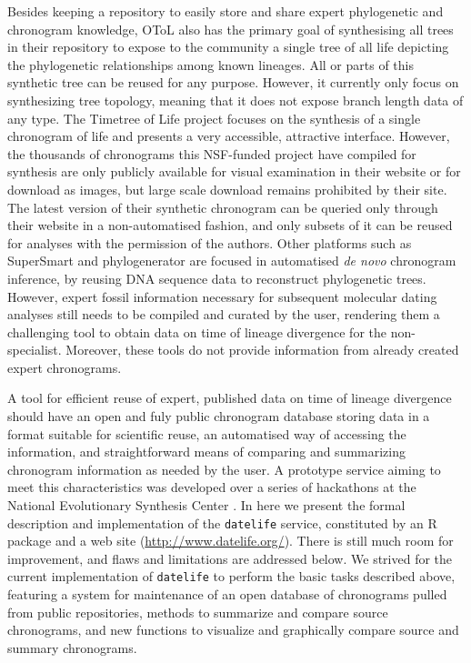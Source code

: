 \documentclass[11pt,]{article}
\begin{document}
Besides keeping a repository to easily store and share expert
phylogenetic and chronogram knowledge, OToL also has the primary goal of
synthesising all trees in their repository to expose to the community a
single tree of all life depicting the phylogenetic relationships among
known lineages. All or parts of this synthetic tree can be reused for
any purpose. However, it currently only focus on synthesizing tree
topology, meaning that it does not expose branch length data of any
type. The Timetree of Life project focuses on the synthesis of a single
chronogram of life \citep{Hedges2006} and presents a very accessible,
attractive interface. However, the thousands of chronograms this
NSF-funded project have compiled for synthesis are only publicly
available for visual examination in their website or for download as
images, but large scale download remains prohibited by their site. The
latest version of their synthetic chronogram \citep{Kumar2017} can be
queried only through their website in a non-automatised fashion, and
only subsets of it can be reused for analyses with the permission of the
authors. Other platforms such as SuperSmart
\citep{antonelli2017supersmart} and phylogenerator
\citep{pearse2013phylogenerator} are focused in automatised \emph{de
novo} chronogram inference, by reusing DNA sequence data to reconstruct
phylogenetic trees. However, expert fossil information necessary for
subsequent molecular dating analyses still needs to be compiled and
curated by the user, rendering them a challenging tool to obtain data on
time of lineage divergence for the non-specialist. Moreover, these tools
do not provide information from already created expert chronograms.

A tool for efficient reuse of expert, published data on time of lineage
divergence should have an open and fuly public chronogram database
storing data in a format suitable for scientific reuse, an automatised
way of accessing the information, and straightforward means of comparing
and summarizing chronogram information as needed by the user. A
prototype service aiming to meet this characteristics was developed over
a series of hackathons at the National Evolutionary Synthesis Center
\citep{Stoltzfus2013}. In here we present the formal description and
implementation of the \texttt{datelife} service, constituted by an R
package and a web site (\url{http://www.datelife.org/}). There is still
much room for improvement, and flaws and limitations are addressed
below. We strived for the current implementation of \texttt{datelife} to
perform the basic tasks described above, featuring a system for
maintenance of an open database of chronograms pulled from public
repositories, methods to summarize and compare source chronograms, and
new functions to visualize and graphically compare source and summary
chronograms.
\end{document}
